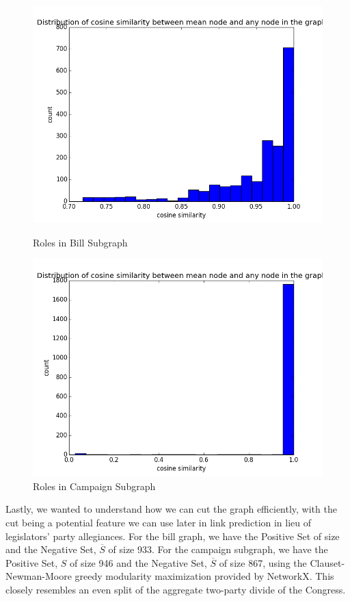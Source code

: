 \documentclass[12pt,twocolumn]{article}
\begin{document}
\begin{figure}
\centering
\begin{minipage}{0.45\linewidth}

\includegraphics[width=\linewidth]{bill_role}
\caption{Roles in Bill Subgraph}
\label{fig:billrole}
\end{minipage}\hfill
\begin{minipage}{0.45\linewidth}

\includegraphics[width=\linewidth]{campaign_role}
\caption{Roles in Campaign Subgraph}
\label{fig:campaignrole}
 \end{minipage}
\end{figure}


Lastly, we wanted to understand how we can cut the graph efficiently, with the cut being a potential feature we can use later in link prediction in lieu of legislators' party allegiances. For the bill graph, we have the Positive Set of size  and the Negative Set, $\overline{S}$ of size 933. For the campaign subgraph, we have the Positive Set, $S$ of size 946 and the Negative Set, $\overline{S}$ of size 867, using the Clauset-Newman-Moore greedy modularity maximization provided by NetworkX. This closely resembles an even split of the aggregate two-party divide of the Congress. 
\end{document}
